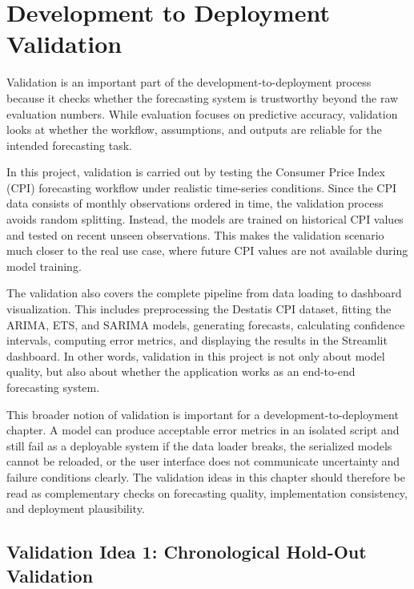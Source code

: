 %
%
%


\chapter{Development to Deployment Validation}

Validation is an important part of the development-to-deployment process because it checks whether the forecasting system is trustworthy beyond the raw evaluation numbers. While evaluation focuses on predictive accuracy, validation looks at whether the workflow, assumptions, and outputs are reliable for the intended forecasting task.

In this project, validation is carried out by testing the Consumer Price Index (CPI) forecasting workflow under realistic time-series conditions. Since the CPI data consists of monthly observations ordered in time, the validation process avoids random splitting. Instead, the models are trained on historical CPI values and tested on recent unseen observations. This makes the validation scenario much closer to the real use case, where future CPI values are not available during model training.

The validation also covers the complete pipeline from data loading to dashboard visualization. This includes preprocessing the Destatis CPI dataset, fitting the ARIMA, ETS, and SARIMA models, generating forecasts, calculating confidence intervals, computing error metrics, and displaying the results in the Streamlit dashboard. In other words, validation in this project is not only about model quality, but also about whether the application works as an end-to-end forecasting system.

This broader notion of validation is important for a development-to-deployment chapter. A model can produce acceptable error metrics in an isolated script and still fail as a deployable system if the data loader breaks, the serialized models cannot be reloaded, or the user interface does not communicate uncertainty and failure conditions clearly. The validation ideas in this chapter should therefore be read as complementary checks on forecasting quality, implementation consistency, and deployment plausibility.

\section{Validation Idea 1: Chronological Hold-Out Validation}

